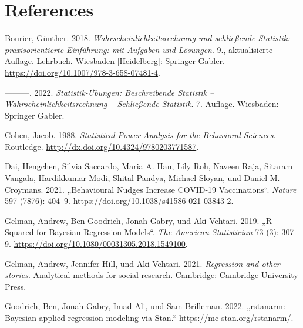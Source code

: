\documentclass[
  a4paper,
  DIV=11]{scrreprt}
\newlength{\cslhangindent}
\newlength{\cslentryspacingunit} %
\newenvironment{CSLReferences}[2] %
 {%
  \setlength{\parindent}{0pt}
  \ifodd #1
  \let\oldpar\par
  \def\par{\hangindent=\cslhangindent\oldpar}
  \fi
  \setlength{\parskip}{#2\cslentryspacingunit}
 }%
 {}
\theoremstyle{definition}
\theoremstyle{remark}
\begin{document}

\hypertarget{references}{%
\chapter*{References}\label{references}}

\hypertarget{refs}{}
\begin{CSLReferences}{1}{0}
\leavevmode{}%
Bourier, Günther. 2018. \emph{Wahrscheinlichkeitsrechnung und
schließende Statistik: praxisorientierte Einführung: mit Aufgaben und
Lösungen}. 9., aktualisierte Auflage. Lehrbuch. Wiesbaden
{[}Heidelberg{]}: Springer Gabler.
\url{https://doi.org/10.1007/978-3-658-07481-4}.

\leavevmode{}%
---------. 2022. \emph{Statistik-Übungen: Beschreibende Statistik --
Wahrscheinlichkeitsrechnung -- Schließende Statistik}. 7. Auflage.
Wiesbaden: Springer Gabler.

\leavevmode{}%
Cohen, Jacob. 1988. \emph{Statistical Power Analysis for the Behavioral
Sciences}. Routledge. \url{http://dx.doi.org/10.4324/9780203771587}.

\leavevmode{}%
Dai, Hengchen, Silvia Saccardo, Maria A. Han, Lily Roh, Naveen Raja,
Sitaram Vangala, Hardikkumar Modi, Shital Pandya, Michael Sloyan, und
Daniel M. Croymans. 2021. {„Behavioural Nudges Increase {COVID}-19
Vaccinations``}. \emph{Nature} 597 (7876): 404--9.
\url{https://doi.org/10.1038/s41586-021-03843-2}.

\leavevmode{}%
Gelman, Andrew, Ben Goodrich, Jonah Gabry, und Aki Vehtari. 2019.
{„R-Squared for Bayesian Regression Models``}. \emph{The American
Statistician} 73 (3): 307--9.
\url{https://doi.org/10.1080/00031305.2018.1549100}.

\leavevmode{}%
Gelman, Andrew, Jennifer Hill, und Aki Vehtari. 2021. \emph{Regression
and other stories}. Analytical methods for social research. Cambridge:
Cambridge University Press.

\leavevmode{}%
Goodrich, Ben, Jonah Gabry, Imad Ali, und Sam Brilleman. 2022.
{„rstanarm: {Bayesian} applied regression modeling via {Stan}.``}
\url{https://mc-stan.org/rstanarm/}.


\end{CSLReferences}
\end{document}

